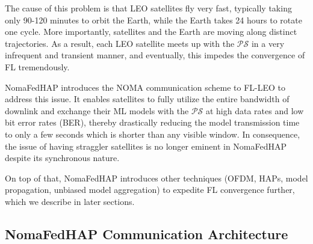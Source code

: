 \documentclass[letter,journal]{IEEEtran}
\begin{document}
The cause of this problem is that LEO satellites fly very fast, typically taking only 90-120 minutes to orbit the Earth, while the Earth takes 24 hours to rotate one cycle. More importantly, satellites and the Earth are moving along distinct trajectories. As a result, each LEO satellite meets up with the $\mathcal {PS}$ in a very infrequent and transient manner, and eventually, this impedes the convergence of FL tremendously.%

NomaFedHAP introduces the NOMA communication scheme to FL-LEO to address this issue. It enables satellites to fully utilize the entire bandwidth of downlink and exchange their ML models with the $\mathcal {PS}$ at high data rates and low bit error rates (BER), thereby drastically reducing the model transmission time to only a few seconds which is shorter than any visible window. In consequence, the issue of having straggler satellites is no longer eminent in NomaFedHAP despite its synchronous nature.

On top of that, NomaFedHAP introduces other techniques (OFDM, HAPs, model propagation, unbiased model aggregation) to expedite FL convergence further, which we describe in later sections.%

\subsection{NomaFedHAP Communication Architecture}
\end{document}
